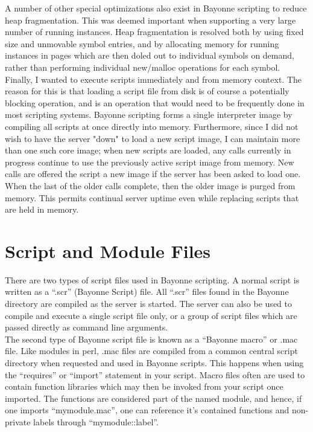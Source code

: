 \documentclass[a4paper,12pt]{article}
\begin{document}
A number of other special optimizations also exist in Bayonne scripting
to reduce heap fragmentation.  This was deemed important when supporting
a very large number of running instances.  Heap fragmentation is resolved
both by using fixed size and unmovable symbol entries, and by allocating
memory for running instances in pages which are then doled out to
individual symbols on demand, rather than performing individual new/malloc
operations for each symbol. \\

Finally, I wanted to execute scripts immediately and from memory
context.  The reason for this is that loading a script file from disk is
of course a potentially blocking operation, and is an operation that
would need to be frequently done in most scripting systems.  Bayonne
scripting forms a single interpreter image by compiling all scripts at
once directly into memory.  Furthermore, since I did not wish to have
the server "down" to load a new script image, I can maintain more than
one such core image; when new scripts are loaded, any calls currently in
progress continue to use the previously active script image from memory. 
New calls are offered the script a new image if the server has been
asked to load one.  When the last of the older calls complete, then the
older image is purged from memory.  This permits continual server uptime
even while replacing scripts that are held in memory. \\

\section{Script and Module Files}

There are two types of script files used in Bayonne scripting.  A normal
script is written as a ``.scr'' (Bayonne Script) file.  All ``.scr''
files found in the Bayonne directory are compiled as the server is
started.  The server can also be used to compile and execute a single
script file only, or a group of script files which are passed directly as
command line arguments. \\

The second type of Bayonne script file is known as a ``Bayonne macro'' 
or .mac file.  Like modules in perl, .mac files are compiled from a 
common central script directory when requested and used in Bayonne 
scripts.  This happens when using the ``requires'' or ``import'' 
statement in your script.  Macro files often are used to contain 
function libraries which may then be invoked from your script once 
imported.  The functions are considered part of the named module, and 
hence, if one imports ``mymodule.mac'', one can reference it's contained 
functions and non-private labels through ``mymodule::label''. \\
\end{document}
